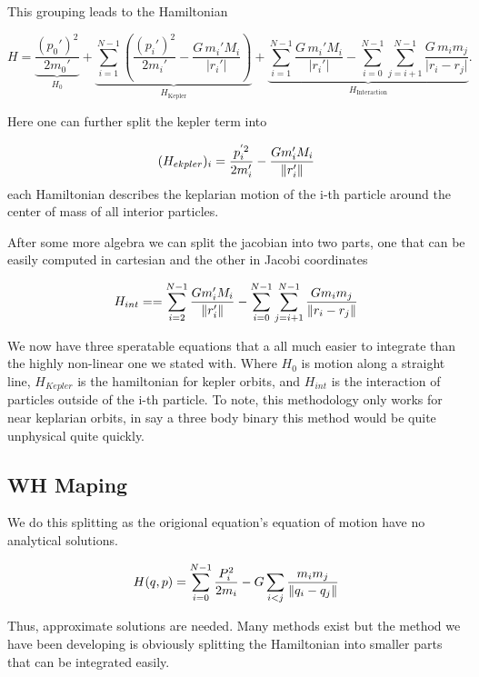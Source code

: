 This grouping leads to the Hamiltonian





\[
	H =
	\underbrace{\frac{(p_0')^{2}}{2 m_0'}}_{H_0}
	+
	\underbrace{
		\sum_{i=1}^{N-1}
		\left(
		\frac{(p_i')^{2}}{2 m_i'}
		-
		\frac{G\, m_i' M_i}{\lvert r_i' \rvert}
		\right)
	}_{H_{\text{Kepler}}}
	+
	\underbrace{
		\sum_{i=1}^{N-1}
		\frac{G\, m_i' M_i}{\lvert r_i' \rvert}
		-
		\sum_{i=0}^{N-1}
		\sum_{j=i+1}^{N-1}
		\frac{G\, m_i m_j}{\lvert r_i - r_j \rvert}
	}_{H_{\text{Interaction}}}.
\]







Here one can further split the kepler term into

\[
	(H_{ekpler})_i = \frac{p^{'2}_i}{2m'_i} - \frac{Gm'_i M_i}{\norm{r'_i}}
\]
each Hamiltonian describes the keplarian motion of the i-th particle around the center of mass of all interior  particles.

After some more algebra we can split the jacobian into two parts, one that can be easily computed in cartesian and the other in Jacobi coordinates

\[
	H_{int} == \sum_{i=2}^{N-1} \frac{Gm'_i M_i}{\norm{r'_i}} - \sum_{i=0}^{N-1} \sum_{j=i+1}^{N-1} \frac{Gm_im_j}{\norm{r_i - r_j}}
\]

We now have three speratable equations that a all much easier to integrate than the highly non-linear one we stated with. Where $H_0$ is motion along a straight line, $H_{Kepler}$ is the hamiltonian for kepler orbits, and $H_{int}$ is the interaction of particles outside of the i-th particle. To note, this methodology only works for near keplarian orbits, in say a three body binary this method would be quite unphysical quite quickly.

\subsection{WH Maping}

We do this splitting as the origional equation's equation of motion have no analytical solutions.

\[
	H(q,p) = \sum_{i=0}^{N-1}\frac{P^2_i}
	{2m_i} - G \sum_{i<j} \frac{m_i m_j}{\norm{q_i - q_j}}
\]

Thus, approximate solutions are needed. Many methods exist but the method we have been developing is obviously splitting the Hamiltonian into smaller parts that can be integrated easily.

